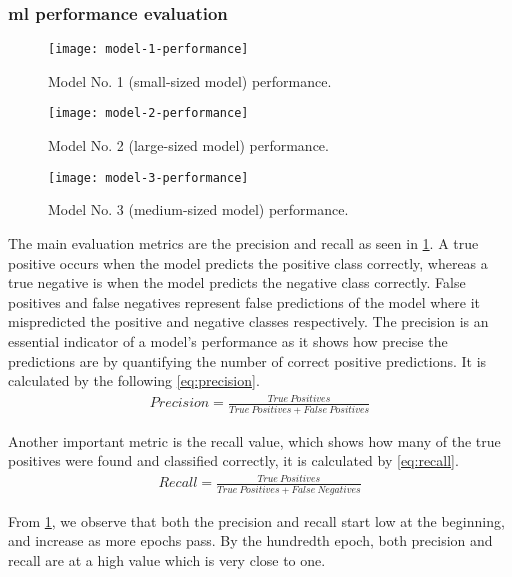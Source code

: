 \documentclass[../main.tex]{subfiles}
\begin{document}
\subsubsection{\gls{ml} performance evaluation}

\begin{figure}[bp] 
	\centering
	\texttt{[image: model-1-performance]} 
        \caption{Model No. 1 (small-sized model) performance.} \label{fig:model-1-performance} 
\end{figure}

\begin{figure}[tbp] 
	\centering
	\texttt{[image: model-2-performance]} 
        \caption{Model No. 2 (large-sized model) performance.} \label{fig:model-2-performance} 
\end{figure}

\begin{figure}[tbp] 
	\centering
	\texttt{[image: model-3-performance]} 
        \caption{Model No. 3 (medium-sized model) performance.} \label{fig:model-3-performance} 
\end{figure}

The main evaluation metrics are the precision and recall
as seen in \cref{fig:model-1-performance}.
A true positive occurs when the model predicts the positive class correctly, whereas 
a true negative is when the model predicts the negative class correctly. 
False positives and false negatives represent false predictions of the model 
where it mispredicted the positive and negative classes respectively.
The precision is an essential indicator of a model's performance as it shows 
how precise the predictions are by quantifying the number of correct positive predictions. 
It is calculated by the following \cref{eq:precision}. 
%
\begin{align}
    Precision =  \frac{True\ Positives}{True\ Positives + False\ Positives} \label{eq:precision}
\end{align}

Another important metric is the recall value, which shows how many of the 
true positives were found and classified correctly, it is calculated by \cref{eq:recall}.
%
\begin{align}
    Recall =  \frac{True\ Positives}{True\ Positives + False\ Negatives} \label{eq:recall}
\end{align}

From \cref{fig:model-1-performance}, we observe that both the precision and recall start low 
at the beginning, and increase as more epochs pass. By the hundredth 
epoch, both precision and recall are at a high value which is very close 
to one.  
\end{document}
